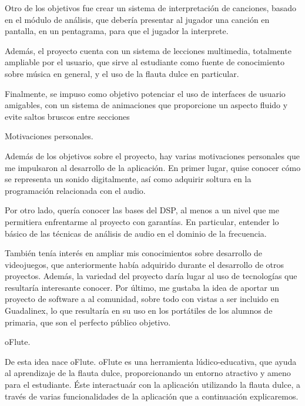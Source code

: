 \documentclass[landscape]{article}
\newenvironment{nota}
{%
\begin{framed} \noindent\itshape
}
{%
\end{framed}\vspace{-0.5cm} }
\begin{document}
\begin{multicols*}{2}
 Otro de los objetivos fue crear un sistema de interpretación de
canciones, basado en el módulo de análisis, que debería presentar al jugador una
canción en pantalla, en un pentagrama, para que el jugador la interprete.

 Además, el proyecto cuenta con un sistema de lecciones multimedia, totalmente
ampliable por el usuario, que sirve al estudiante como fuente de conocimiento
sobre música en general, y el uso de la flauta dulce en particular.

 Finalmente, se impuso como objetivo potenciar el uso de interfaces de usuario
amigables, con un sistema de animaciones que proporcione un aspecto fluido y
evite saltos bruscos entre secciones

\begin{nota}
  Motivaciones personales.
\end{nota}

Además de los objetivos sobre el proyecto, hay varias motivaciones personales
que me impulsaron al desarrollo de la aplicación. En primer lugar, quise conocer
cómo se representa un sonido digitalmente, así como adquirir soltura en la
programación relacionada con el audio.

 Por otro lado, quería conocer las bases del DSP, al menos a un
nivel que me permitiera enfrentarme al proyecto con garantías. En particular,
entender lo básico de las técnicas de análisis de audio en el dominio de la
frecuencia.

 También tenía interés en ampliar mis conocimientos sobre
desarrollo de videojuegos, que anteriormente había adquirido durante el
desarrollo de otros proyectos. Además, la variedad del proyecto daría lugar al
uso de tecnologías que resultaría interesante conocer. Por último, me gustaba la
idea de aportar un proyecto de software a al comunidad, sobre todo con vistas a
ser incluido en Guadalinex, lo que resultaría en su uso en los portátiles de los
alumnos de primaria, que son el perfecto público objetivo.

\begin{nota}
  oFlute.
\end{nota}

De esta idea nace oFlute. oFlute es una herramienta lúdico-educativa, que ayuda
al aprendizaje de la flauta dulce, proporcionando un entorno atractivo y ameno
para el estudiante. Éste interactuaár con la aplicación utilizando la flauta
dulce, a través de varias funcionalidades de la aplicación que a continuación
explicaremos.


\end{multicols*}
\end{document}
